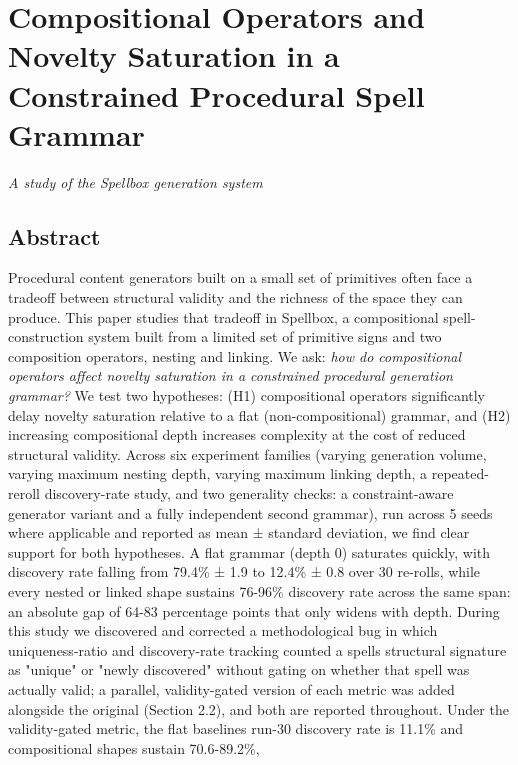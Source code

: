 \documentclass[
  10pt,
  twocolumn]{article}
\author{}
\date{}
\begin{document}
\section{Compositional Operators and Novelty Saturation in a Constrained
Procedural Spell
Grammar}\label{compositional-operators-and-novelty-saturation-in-a-constrained-procedural-spell-grammar}

\emph{A study of the Spellbox generation system}

\subsection{Abstract}\label{abstract}

Procedural content generators built on a small set of primitives often
face a tradeoff between structural validity and the richness of the
space they can produce. This paper studies that tradeoff in Spellbox, a
compositional spell-construction system built from a limited set of
primitive signs and two composition operators, nesting and linking. We
ask: \emph{how do compositional operators affect novelty saturation in a
constrained procedural generation grammar?} We test two hypotheses: (H1)
compositional operators significantly delay novelty saturation relative
to a flat (non-compositional) grammar, and (H2) increasing compositional
depth increases complexity at the cost of reduced structural validity.
Across six experiment families (varying generation volume, varying
maximum nesting depth, varying maximum linking depth, a repeated-reroll
discovery-rate study, and two generality checks: a constraint-aware
generator variant and a fully independent second grammar), run across 5
seeds where applicable and reported as mean ± standard deviation, we
find clear support for both hypotheses. A flat grammar (depth 0)
saturates quickly, with discovery rate falling from 79.4\% ± 1.9 to
12.4\% ± 0.8 over 30 re-rolls, while every nested or linked shape
sustains 76-96\% discovery rate across the same span: an absolute gap of
64-83 percentage points that only widens with depth. During this study
we discovered and corrected a methodological bug in which
uniqueness-ratio and discovery-rate tracking counted a
spell\textquotesingle s structural signature as "unique" or "newly
discovered" without gating on whether that spell was actually valid; a
parallel, validity-gated version of each metric was added alongside the
original (Section 2.2), and both are reported throughout. Under the
validity-gated metric, the flat baseline\textquotesingle s run-30
discovery rate is 11.1\% and compositional shapes sustain 70.6-89.2\%,
\end{document}
